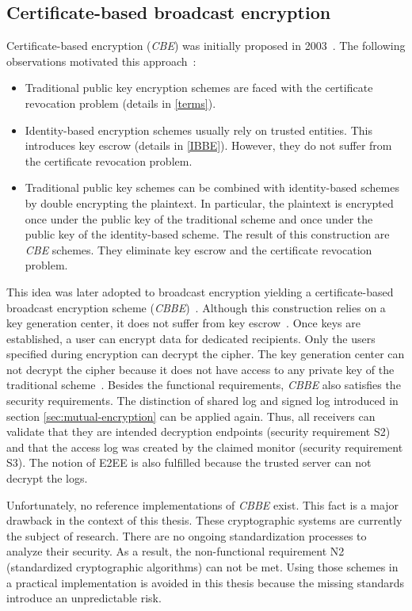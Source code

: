 \documentclass[../main.tex]{subfiles}
\begin{document}
\subsection{Certificate-based broadcast encryption}
\label{sec:broadcast-certificate}

Certificate-based encryption (\emph{CBE}) was initially proposed in 2003~\cite{Gentry2003}. 
The following observations motivated this approach~\cite{Hagg2022}:
\begin{itemize}
    \item 
    Traditional public key encryption schemes are faced with the certificate revocation problem (details in \cref{terms}).
    \item 
    Identity-based encryption schemes usually rely on trusted entities. 
    This introduces key escrow (details in \cref{IBBE}).
    However, they do not suffer from the certificate revocation problem.
    \item 
    Traditional public key schemes can be combined with identity-based schemes by double encrypting the plaintext.
    In particular, the plaintext is encrypted once under the public key of the traditional scheme and once under the public key of the identity-based scheme.
    The result of this construction are \emph{CBE} schemes.
    They eliminate key escrow and the certificate revocation problem.
\end{itemize}

This idea was later adopted to broadcast encryption yielding a certificate-based broadcast encryption scheme (\emph{CBBE})~\cite{Li2018}.
Although this construction relies on a key generation center, it does not suffer from key escrow~\cite{Hagg2022}.
Once keys are established, a user can encrypt data for dedicated recipients.
Only the users specified during encryption can decrypt the cipher.
The key generation center can not decrypt the cipher because it does not have access to any private key of the traditional scheme~\cite{Hagg2022}.
Besides the functional requirements, \emph{CBBE} also satisfies the security requirements.
The distinction of shared log and signed log introduced in section \ref{sec:mutual-encryption} can be applied again.
Thus, all receivers can validate that they are intended decryption endpoints (security requirement S2) and that the access log was created by the claimed monitor (security requirement S3).
The notion of E2EE is also fulfilled because the trusted server can not decrypt the logs.

Unfortunately, no reference implementations of \emph{CBBE} exist.
This fact is a major drawback in the context of this thesis.
These cryptographic systems are currently the subject of research.
There are no ongoing standardization processes to analyze their security.
As a result, the non-functional requirement N2 (standardized cryptographic algorithms) can not be met.
Using those schemes in a practical implementation is avoided in this thesis because the missing standards introduce an unpredictable risk.
\end{document}
